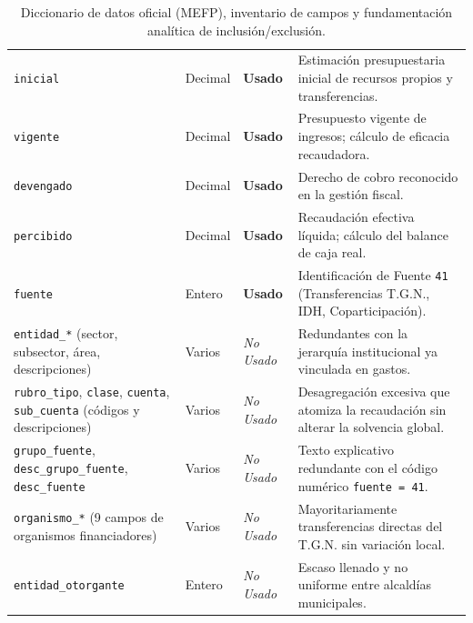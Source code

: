 \begin{table}[H]
\begin{tabularx}{\textwidth}{p{3.2cm}p{1.6cm}p{1.4cm}>{\raggedright\arraybackslash}X}
\texttt{inicial} & Decimal & \textbf{Usado} & Estimación presupuestaria inicial de recursos propios y transferencias. \\
\texttt{vigente} & Decimal & \textbf{Usado} & Presupuesto vigente de ingresos; cálculo de eficacia recaudadora. \\
\texttt{devengado} & Decimal & \textbf{Usado} & Derecho de cobro reconocido en la gestión fiscal. \\
\texttt{percibido} & Decimal & \textbf{Usado} & Recaudación efectiva líquida; cálculo del balance de caja real. \\
\texttt{fuente} & Entero & \textbf{Usado} & Identificación de Fuente \texttt{41} (Transferencias T.G.N., IDH, Coparticipación). \\
\addlinespace
\texttt{entidad\_*} (sector, subsector, área, descripciones) & Varios & \textit{No Usado} & Redundantes con la jerarquía institucional ya vinculada en gastos. \\
\texttt{rubro\_tipo}, \texttt{clase}, \texttt{cuenta}, \texttt{sub\_cuenta} (códigos y descripciones) & Varios & \textit{No Usado} & Desagregación excesiva que atomiza la recaudación sin alterar la solvencia global. \\
\texttt{grupo\_fuente}, \texttt{desc\_grupo\_fuente}, \texttt{desc\_fuente} & Varios & \textit{No Usado} & Texto explicativo redundante con el código numérico \texttt{fuente = 41}. \\
\texttt{organismo\_*} (9 campos de organismos financiadores) & Varios & \textit{No Usado} & Mayoritariamente transferencias directas del T.G.N. sin variación local. \\
\texttt{entidad\_otorgante} & Entero & \textit{No Usado} & Escaso llenado y no uniforme entre alcaldías municipales. \\
\bottomrule
\end{tabularx}
\caption{Diccionario de datos oficial (MEFP), inventario de campos y fundamentación analítica de inclusión/exclusión.}
\label{tab:diccionario_datos}
\end{table}

